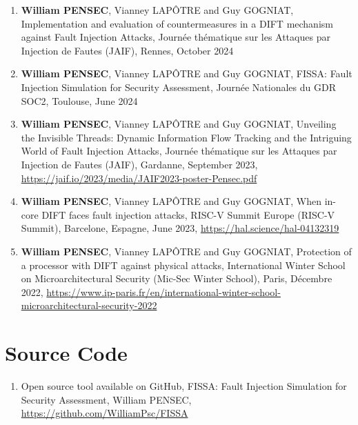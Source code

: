 \begin{enumerate}
    \item \textbf{William PENSEC}, Vianney LAPÔTRE and Guy GOGNIAT, Implementation and evaluation of countermeasures in a DIFT mechanism against Fault Injection Attacks, Journée thématique sur les Attaques par Injection de Fautes (JAIF), Rennes, October 2024
    \item \textbf{William PENSEC}, Vianney LAPÔTRE and Guy GOGNIAT, FISSA: Fault Injection Simulation for Security Assessment, Journée Nationales du GDR SOC2, Toulouse, June 2024
    \item \textbf{William PENSEC}, Vianney LAPÔTRE and Guy GOGNIAT, Unveiling the Invisible Threads: Dynamic Information Flow Tracking and the Intriguing World of Fault Injection Attacks, Journée thématique sur les Attaques par Injection de Fautes (JAIF), Gardanne, September 2023, \url{https://jaif.io/2023/media/JAIF2023-poster-Pensec.pdf}
    \item \textbf{William PENSEC}, Vianney LAPÔTRE and Guy GOGNIAT, When in-core DIFT faces fault injection attacks, RISC-V Summit Europe (RISC-V Summit), Barcelone, Espagne, June 2023, \url{https://hal.science/hal-04132319}
    \item \textbf{William PENSEC}, Vianney LAPÔTRE and Guy GOGNIAT, Protection of a processor with DIFT against physical attacks, International Winter School on Microarchitectural Security (Mic-Sec Winter School), Paris, Décembre 2022, \url{https://www.ip-paris.fr/en/international-winter-school-microarchitectural-security-2022}
\end{enumerate}
\section{Source Code}

\begin{enumerate}
    \item Open source tool available on GitHub, FISSA: Fault Injection Simulation for Security Assessment, William PENSEC, \url{https://github.com/WilliamPsc/FISSA}
\end{enumerate}
